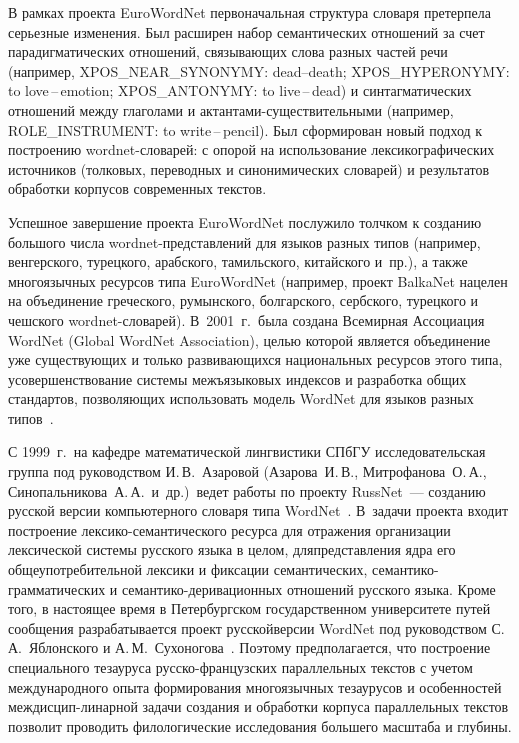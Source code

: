 \begin{multicols}{2}
     
     В рамках проекта EuroWordNet первоначальная структура словаря 
претерпела серьезные изменения. Был расширен набор семантических 
отношений за счет парадигматических отношений, связывающих слова 
разных час\-тей речи (например, XPOS\_NEAR\_SYNONYMY: dead--death; 
XPOS\_HYPERONYMY: to love\,--\,emotion; XPOS\_ANTONYMY: to live\,--\,dead) и 
синтагматических отношений между глаголами и ак\-тан\-та\-ми-су\-ще\-ст\-ви\-тель\-ны\-ми 
(например, ROLE\_INSTRUMENT: to write\,--\,pencil). 
Был сформирован новый подход к построению wordnet-сло\-ва\-рей: с опорой 
на использование лексикографических источников (толковых, переводных и 
синонимических словарей) и результатов обработки корпусов современных 
текстов. 
     
     Успешное завершение проекта EuroWordNet послужило толчком к 
созданию большого числа wordnet-пред\-став\-ле\-ний для языков разных 
типов (например, венгерского, турецкого, арабского, тамильского, 
китайского и~пр.), а также многоязычных ресурсов типа EuroWordNet 
(например, проект BalkaNet нацелен на объединение греческого, румынского, 
болгарского, сербского, турецкого и чешского wordnet-сло\-ва\-рей). 
В~2001~г.\ была создана Всемирная Ассоциация WordNet (Global WordNet 
Association), целью которой является объединение уже существующих и 
только развивающихся национальных ресурсов этого типа, 
усовершенствование системы межъязыковых индексов и разработка общих 
стандартов, позволяющих использовать модель WordNet для языков разных 
типов~\cite{6-ko}.
     
     С 1999~г.\ на кафедре математической лингвистики СПбГУ 
исследовательская группа под руководством И.\,В.~Азаровой 
(Азарова~И.\,В., Митрофанова~О.\,А., Синопальникова~А.\,А.\ и~др.)\ ведет 
работы по проекту RussNet~--- созданию русской версии компьютерного 
словаря типа WordNet~\cite{15-ko}. В~задачи проекта входит построение 
лек\-си\-ко-се\-ман\-ти\-че\-ско\-го ресурса для отражения организации 
лексической системы русского языка в целом, для\linebreak представления ядра его 
общеупотребительной лексики и фиксации семантических, 
     се\-ман\-ти\-ко-грам\-ма\-ти\-че\-ских и 
     се\-ман\-ти\-ко-де\-ри\-ва\-ци\-он\-ных отношений русского языка. 
Кроме того, в настоящее \mbox{время} в Петербургском государственном 
университете путей сообщения разрабатывается проект русской\linebreak версии 
WordNet под руководством С.\,А.~Яблонского и 
     А.\,М.~Сухоногова~\cite{12-ko}.
     Поэтому предполагается, что построение специального тезауруса\linebreak 
     рус\-ско-фран\-цуз\-ских параллельных текстов с учетом 
меж\-ду\-на\-род\-ного опыта формирования многоязычных тезаурусов и 
особенностей меж\-дис\-цип-\linebreak ли\-нар\-ной задачи создания и обработки корпуса\linebreak 
параллельных текстов позволит проводить филологические исследования 
большего масштаба и глубины.
     

\end{multicols}
